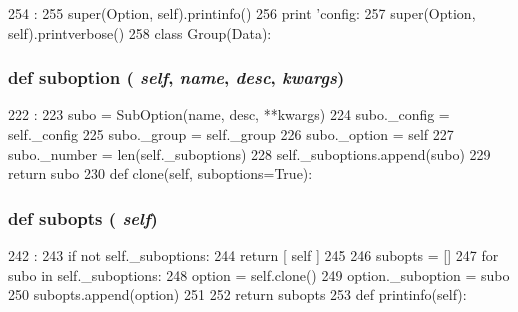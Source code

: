 \begin{DoxyCode}
254                        :
255         super(Option, self).printinfo()
256         print 'config: %
257         super(Option, self).printverbose()
258 
class Group(Data):
\end{DoxyCode}
\hypertarget{classm5_1_1util_1_1jobfile_1_1Option_ae08e10a2c78f3252cacf63af0ba9f9e5}{
\subsubsection[{suboption}]{\setlength{\rightskip}{0pt plus 5cm}def suboption ( {\em self}, \/   {\em name}, \/   {\em desc}, \/   {\em kwargs})}}
\label{classm5_1_1util_1_1jobfile_1_1Option_ae08e10a2c78f3252cacf63af0ba9f9e5}



\begin{DoxyCode}
222                                              :
223         subo = SubOption(name, desc, **kwargs)
224         subo._config = self._config
225         subo._group = self._group
226         subo._option = self
227         subo._number = len(self._suboptions)
228         self._suboptions.append(subo)
229         return subo
230 
    def clone(self, suboptions=True):
\end{DoxyCode}
\hypertarget{classm5_1_1util_1_1jobfile_1_1Option_a5f5171e812f65a70d0876081203f320f}{
\subsubsection[{subopts}]{\setlength{\rightskip}{0pt plus 5cm}def subopts ( {\em self})}}
\label{classm5_1_1util_1_1jobfile_1_1Option_a5f5171e812f65a70d0876081203f320f}



\begin{DoxyCode}
242                      :
243         if not self._suboptions:
244             return [ self ]
245 
246         subopts = []
247         for subo in self._suboptions:
248             option = self.clone()
249             option._suboption = subo
250             subopts.append(option)
251 
252         return subopts
253 
    def printinfo(self):
\end{DoxyCode}


